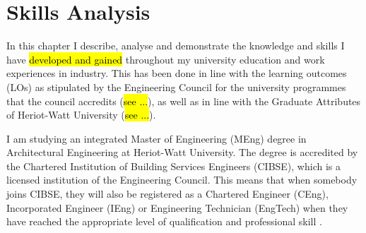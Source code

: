 \chapter{Skills Analysis} %

\label{Chapter3} %


In this chapter I describe, analyse and demonstrate the knowledge and skills I have \hl{developed and gained} throughout my university education and work experiences in industry.
This has been done in line with the learning outcomes (LOs) as stipulated by the Engineering Council for the university programmes that the council accredits (\hl{see ...}), as well as in line with the Graduate Attributes of Heriot-Watt University (\hl{see ...}).

I am studying an integrated Master of Engineering (MEng) degree in Architectural Engineering at Heriot-Watt University.
The degree is accredited by the Chartered Institution of Building Services Engineers (CIBSE), which is a licensed institution of the Engineering Council.
This means that when somebody joins CIBSE, they will also be registered as a Chartered Engineer (CEng), Incorporated Engineer (IEng) or Engineering Technician (EngTech) when they have reached the appropriate level of qualification and professional skill \citep{whyjoinCIBSE}.

